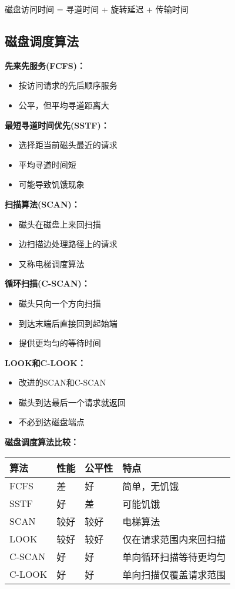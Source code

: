 \documentclass[lang=cn,newtx,10pt,scheme=chinese]{../../elegantbook}
\begin{document}
磁盘访问时间 = 寻道时间 + 旋转延迟 + 传输时间

\subsection{磁盘调度算法}

\textbf{先来先服务(FCFS)：}
\begin{itemize}
  \item 按访问请求的先后顺序服务
  \item 公平，但平均寻道距离大
\end{itemize}

\textbf{最短寻道时间优先(SSTF)：}
\begin{itemize}
  \item 选择距当前磁头最近的请求
  \item 平均寻道时间短
  \item 可能导致饥饿现象
\end{itemize}

\textbf{扫描算法(SCAN)：}
\begin{itemize}
  \item 磁头在磁盘上来回扫描
  \item 边扫描边处理路径上的请求
  \item 又称电梯调度算法
\end{itemize}

\textbf{循环扫描(C-SCAN)：}
\begin{itemize}
  \item 磁头只向一个方向扫描
  \item 到达末端后直接回到起始端
  \item 提供更均匀的等待时间
\end{itemize}

\textbf{LOOK和C-LOOK：}
\begin{itemize}
  \item 改进的SCAN和C-SCAN
  \item 磁头到达最后一个请求就返回
  \item 不必到达磁盘端点
\end{itemize}

\textbf{磁盘调度算法比较：}
\begin{longtable}{@{}p{3cm}p{3cm}p{3cm}p{4cm}@{}}
\toprule
\textbf{算法} & \textbf{性能} & \textbf{公平性} & \textbf{特点} \\ \midrule
\endhead
FCFS & 差 & 好 & 简单，无饥饿 \\
SSTF & 好 & 差 & 可能饥饿 \\
SCAN & 较好 & 较好 & 电梯算法 \\
LOOK & 较好 & 较好 & 仅在请求范围内来回扫描 \\
C-SCAN & 好 & 好 & 单向循环扫描等待更均匀 \\
C-LOOK & 好 & 好 & 单向扫描仅覆盖请求范围 \\
\bottomrule
\end{longtable}
\end{document}
